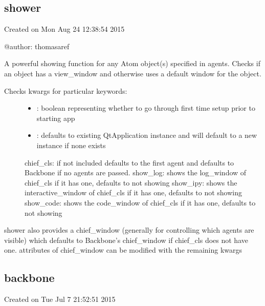 \documentclass[letterpaper,10pt,english]{sphinxmanual}
\begin{document}
\subsection{shower}
\label{core_doc/shower:shower}\label{core_doc/shower:module-taref.core.shower}\label{core_doc/shower::doc}
Created on Mon Aug 24 12:38:54 2015

@author: thomasaref

\begin{fulllineitems}
\label{core_doc/shower:taref.core.shower.shower}
A powerful showing function for any Atom object(s) specified in agents.
Checks if an object has a view\_window and otherwise uses a default window for the object.
\begin{description}
\item[{Checks kwargs for particular keywords:}] \leavevmode\begin{itemize}
\item {} 
: boolean representing whether to go through first time setup prior to starting app

\item {} 
: defaults to existing QtApplication instance and will default to a new instance if none exists

\end{itemize}

chief\_cls: if not included defaults to the first agent and defaults to Backbone if no agents are passed.
show\_log: shows the log\_window of chief\_cls if it has one, defaults to not showing
show\_ipy: shows the interactive\_window of chief\_cls if it has one, defaults to not showing
show\_code: shows the code\_window of chief\_cls if it has one, defaults to not showing

\end{description}

shower also provides a chief\_window (generally for controlling which agents are visible) which defaults to Backbone's chief\_window
if chief\_cls does not have one. attributes of chief\_window can be modified with the remaining kwargs

\end{fulllineitems}



\subsection{backbone}
\label{core_doc/backbone:backbone}\label{core_doc/backbone::doc}\label{core_doc/backbone:module-taref.core.backbone}
Created on Tue Jul  7 21:52:51 2015
\end{document}
